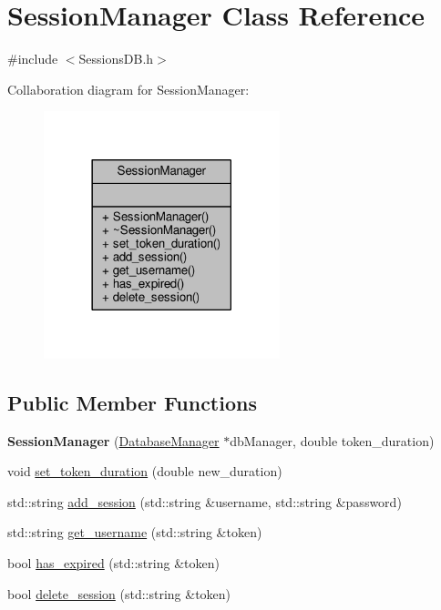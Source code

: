 \hypertarget{classSessionManager}{}\section{Session\+Manager Class Reference}
\label{classSessionManager}


{\ttfamily \#include $<$Sessions\+D\+B.\+h$>$}



Collaboration diagram for Session\+Manager\+:
\nopagebreak
\begin{figure}[H]
\begin{center}
\leavevmode
\includegraphics[width=194pt]{dc/d3b/classSessionManager__coll__graph}
\end{center}
\end{figure}
\subsection*{Public Member Functions}
\begin{DoxyCompactItemize}
\item 
{\bfseries Session\+Manager} (\hyperlink{classDatabaseManager}{Database\+Manager} $\ast$db\+Manager, double token\+\_\+duration)\hypertarget{classSessionManager_a71f71cd3dac81fbfdf04befdb0e9c23d}{}\label{classSessionManager_a71f71cd3dac81fbfdf04befdb0e9c23d}

\item 
void \hyperlink{classSessionManager_a4915ec0e2979d6fd2cd6f05e8cb8ce66}{set\+\_\+token\+\_\+duration} (double new\+\_\+duration)
\item 
std\+::string \hyperlink{classSessionManager_a78f3f5d6c79e2fed689004b82f907de7}{add\+\_\+session} (std\+::string \&username, std\+::string \&password)
\item 
std\+::string \hyperlink{classSessionManager_abf8fda6c095908b47c4d0e02067d8a1f}{get\+\_\+username} (std\+::string \&token)
\item 
bool \hyperlink{classSessionManager_aa3c7fb8279b1d21171a87dd67782012e}{has\+\_\+expired} (std\+::string \&token)
\item 
bool \hyperlink{classSessionManager_a3b74a194c5171443c2716141c02b54bd}{delete\+\_\+session} (std\+::string \&token)
\end{DoxyCompactItemize}


